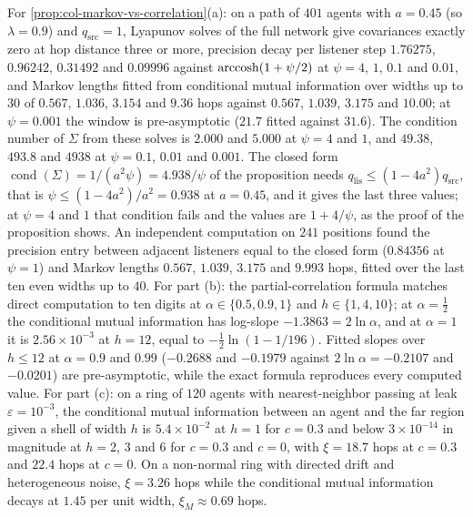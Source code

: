 \begin{numcheck}\label{chk:col-markov}
For \cref{prop:col-markov-vs-correlation}(a): on a path of $401$ agents with $a=0.45$ (so $\lambda=0.9$) and $q_{\mathrm{src}}=1$, Lyapunov solves of the full network give covariances exactly zero at hop distance three or more, precision decay per listener step $1.76275$, $0.96242$, $0.31492$ and $0.09996$ against $\operatorname{arccosh}(1+\psi/2)$ at $\psi=4$, $1$, $0.1$ and $0.01$, and Markov lengths fitted from conditional mutual information over widths up to $30$ of $0.567$, $1.036$, $3.154$ and $9.36$ hops against $0.567$, $1.039$, $3.175$ and $10.00$; at $\psi=0.001$ the window is pre-asymptotic ($21.7$ fitted against $31.6$). The condition number of $\Sigma$ from these solves is $2.000$ and $5.000$ at $\psi=4$ and $1$, and $49.38$, $493.8$ and $4938$ at $\psi=0.1$, $0.01$ and $0.001$. The closed form $\operatorname{cond}(\Sigma)=1/(a^2\psi)=4.938/\psi$ of the proposition needs $q_{\mathrm{lis}}\le(1-4a^2)q_{\mathrm{src}}$, that is $\psi\le(1-4a^2)/a^2=0.938$ at $a=0.45$, and it gives the last three values; at $\psi=4$ and $1$ that condition fails and the values are $1+4/\psi$, as the proof of the proposition shows. An independent computation on $241$ positions found the precision entry between adjacent listeners equal to the closed form ($0.84356$ at $\psi=1$) and Markov lengths $0.567$, $1.039$, $3.175$ and $9.993$ hops, fitted over the last ten even widths up to $40$. For part (b): the partial-correlation formula matches direct computation to ten digits at $\alpha\in\{0.5,0.9,1\}$ and $h\in\{1,4,10\}$; at $\alpha=\frac12$ the conditional mutual information has log-slope $-1.3863=2\ln\alpha$, and at $\alpha=1$ it is $2.56\times10^{-3}$ at $h=12$, equal to $-\frac12\ln(1-1/196)$. Fitted slopes over $h\le12$ at $\alpha=0.9$ and $0.99$ ($-0.2688$ and $-0.1979$ against $2\ln\alpha=-0.2107$ and $-0.0201$) are pre-asymptotic, while the exact formula reproduces every computed value. For part (c): on a ring of $120$ agents with nearest-neighbor passing at leak $\varepsilon=10^{-3}$, the conditional mutual information between an agent and the far region given a shell of width $h$ is $5.4\times10^{-2}$ at $h=1$ for $c=0.3$ and below $3\times10^{-14}$ in magnitude at $h=2$, $3$ and $6$ for $c=0.3$ and $c=0$, with $\xi=18.7$ hops at $c=0.3$ and $22.4$ hops at $c=0$. On a non-normal ring with directed drift and heterogeneous noise, $\xi=3.26$ hops while the conditional mutual information decays at $1.45$ per unit width, $\xi_M\approx0.69$ hops.
\end{numcheck}

